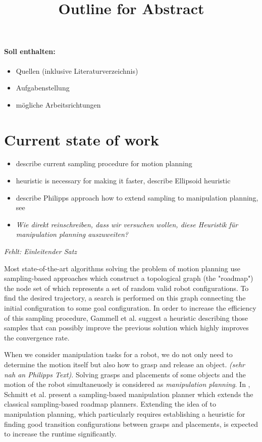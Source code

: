 \documentclass{article}
\title{\textbf{Outline for Abstract}}
\date{}
\begin{document}
\maketitle
\paragraph{Soll enthalten:}
\begin{itemize}
\item Quellen (inklusive Literaturverzeichnis)
\item Aufgabenstellung
\item m\"ogliche Arbeitsrichtungen
\end{itemize}

\section{Current state of work}
\begin{itemize}
\item describe current sampling procedure for motion planning
\item heuristic is necessary for making it faster, describe Ellipsoid heuristic
\item describe Philipps approach how to extend sampling to manipulation planning, see \cite{schmitt2017manipulation}
\item \textit{Wie direkt reinschreiben, dass wir versuchen wollen, diese Heuristik f\"ur manipulation planning auszuweiten?}
\end{itemize}
\textit{Fehlt: Einleitender Satz}

Most state-of-the-art algorithms solving the problem of motion planning use sampling-based approaches which construct a topological graph (the "roadmap") the node set of which represents a set of random valid robot configurations. To find the desired trajectory, a search is performed on this graph connecting the initial configuration to some goal configuration. In order to increase the efficiency of this sampling procedure, Gammell et al. \cite{gammell2014informed} suggest a heuristic describing those samples that can possibly improve the previous solution which highly improves the convergence rate.

When we consider manipulation tasks for a robot, we do not only need to determine the motion itself but also how to grasp and release an object. \textit{(sehr nah an Philipps Text)}. Solving grasps and placements of some objects and the motion of the robot simultaneuosly is considered as \textit{manipulation planning}.
In \cite{schmitt2017manipulation}, Schmitt et al. present a sampling-based manipulation planner which extends the classical sampling-based roadmap planners. Extending the idea of \cite{gammell2014informed} to manipulation planning, which particularly requires establishing a heuristic for finding good transition configurations between grasps and placements, is expected to increase the runtime significantly.
\end{document}
